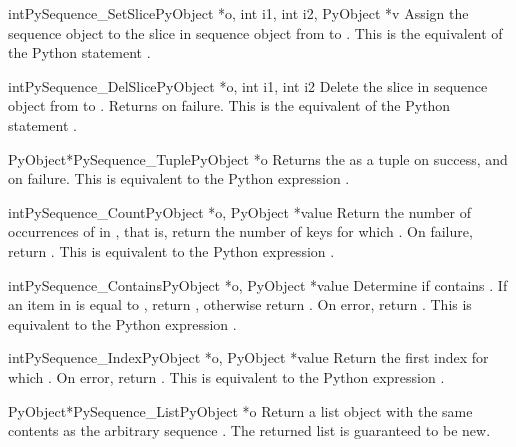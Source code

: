\documentclass{manual}
\begin{document}
\begin{cfuncdesc}{int}{PySequence_SetSlice}{PyObject *o, int i1,
                                            int i2, PyObject *v}
Assign the sequence object  to the slice in sequence
object  from  to .  This is the equivalent of
the Python statement .
\end{cfuncdesc}

\begin{cfuncdesc}{int}{PySequence_DelSlice}{PyObject *o, int i1, int i2}
Delete the slice in sequence object  from  to .
Returns  on failure. This is the equivalent of the Python
statement .
\end{cfuncdesc}

\begin{cfuncdesc}{PyObject*}{PySequence_Tuple}{PyObject *o}
Returns the  as a tuple on success, and \NULL{} on failure.
This is equivalent to the Python expression .
\end{cfuncdesc}

\begin{cfuncdesc}{int}{PySequence_Count}{PyObject *o, PyObject *value}
Return the number of occurrences of  in , that is,
return the number of keys for which .  On failure, return .  This is equivalent to
the Python expression .
\end{cfuncdesc}

\begin{cfuncdesc}{int}{PySequence_Contains}{PyObject *o, PyObject *value}
Determine if  contains .  If an item in  is
equal to , return , otherwise return .  On
error, return .  This is equivalent to the Python expression
.
\end{cfuncdesc}

\begin{cfuncdesc}{int}{PySequence_Index}{PyObject *o, PyObject *value}
Return the first index  for which .  On error, return .    This is equivalent to
the Python expression .
\end{cfuncdesc}

\begin{cfuncdesc}{PyObject*}{PySequence_List}{PyObject *o}
Return a list object with the same contents as the arbitrary sequence
.  The returned list is guaranteed to be new.
\end{cfuncdesc}
\end{document}

